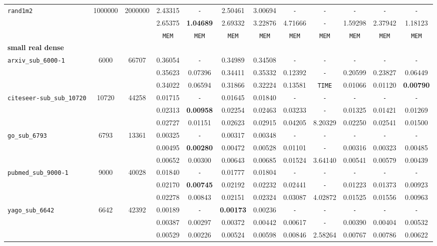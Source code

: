 \begin{table}
{\begin{tabular}{ l c c | c c c c c c c c c }
\hline
\verb|rand1m2| & 1000000 & 2000000 & 2.43315 & \verb|-| & 2.50461 & 3.00694 & \verb|-| & \verb|-| & \verb|-| & \verb|-| & \verb|-| \\
 &  &  & 2.65375 & \textbf{1.04689} & 2.69332 & 3.22876 & 4.71666 & \verb|-| & 1.59298 & 2.37942 & 1.18123 \\
 &  &  & \verb|MEM| & \verb|MEM| & \verb|MEM| & \verb|MEM| & \verb|MEM| & \verb|MEM| & \verb|MEM| & \verb|MEM| & \verb|MEM| \\
\hline
\multicolumn{12}{l}{\textbf{small real dense}} \\
\hline
\verb|arxiv_sub_6000-1| & 6000 & 66707 & 0.36054 & \verb|-| & 0.34989 & 0.34508 & \verb|-| & \verb|-| & \verb|-| & \verb|-| & \verb|-| \\
 &  &  & 0.35623 & 0.07396 & 0.34411 & 0.35332 & 0.12392 & \verb|-| & 0.20599 & 0.23827 & 0.06449 \\
 &  &  & 0.34022 & 0.06594 & 0.31866 & 0.32224 & 0.13581 & \verb|TIME| & 0.01066 & 0.01120 & \textbf{0.00790} \\
\hline
\verb|citeseer-sub_sub_10720| & 10720 & 44258 & 0.01715 & \verb|-| & 0.01645 & 0.01840 & \verb|-| & \verb|-| & \verb|-| & \verb|-| & \verb|-| \\
 &  &  & 0.02313 & \textbf{0.00958} & 0.02254 & 0.02463 & 0.03233 & \verb|-| & 0.01325 & 0.01421 & 0.01269 \\
 &  &  & 0.02727 & 0.01151 & 0.02623 & 0.02915 & 0.04205 & 8.20329 & 0.02250 & 0.02541 & 0.01500 \\
\hline
\verb|go_sub_6793| & 6793 & 13361 & 0.00325 & \verb|-| & 0.00317 & 0.00348 & \verb|-| & \verb|-| & \verb|-| & \verb|-| & \verb|-| \\
 &  &  & 0.00495 & \textbf{0.00280} & 0.00472 & 0.00528 & 0.01101 & \verb|-| & 0.00316 & 0.00323 & 0.00485 \\
 &  &  & 0.00652 & 0.00300 & 0.00643 & 0.00685 & 0.01524 & 3.64140 & 0.00541 & 0.00579 & 0.00439 \\
\hline
\verb|pubmed_sub_9000-1| & 9000 & 40028 & 0.01840 & \verb|-| & 0.01777 & 0.01804 & \verb|-| & \verb|-| & \verb|-| & \verb|-| & \verb|-| \\
 &  &  & 0.02170 & \textbf{0.00745} & 0.02192 & 0.02232 & 0.02441 & \verb|-| & 0.01223 & 0.01373 & 0.00923 \\
 &  &  & 0.02278 & 0.00843 & 0.02151 & 0.02324 & 0.03087 & 4.02872 & 0.01525 & 0.01556 & 0.00963 \\
\hline
\verb|yago_sub_6642| & 6642 & 42392 & 0.00189 & \verb|-| & \textbf{0.00173} & 0.00236 & \verb|-| & \verb|-| & \verb|-| & \verb|-| & \verb|-| \\
 &  &  & 0.00387 & 0.00297 & 0.00372 & 0.00442 & 0.00617 & \verb|-| & 0.00390 & 0.00404 & 0.00532 \\
 &  &  & 0.00529 & 0.00226 & 0.00524 & 0.00598 & 0.00846 & 2.58264 & 0.00767 & 0.00786 & 0.00622 \\
\hline
  \end{tabular}
}
\end{table}

